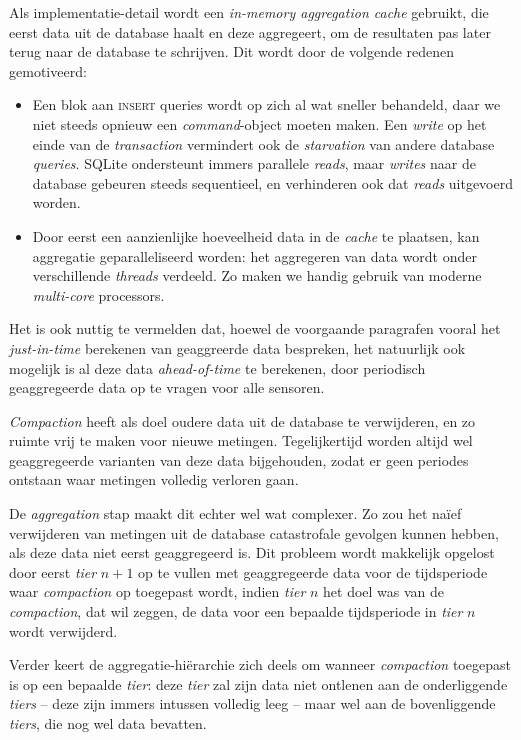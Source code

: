 \documentclass[12pt,draft,parskip=full]{article}
\begin{document}
Als implementatie-detail wordt een \emph{in-memory aggregation cache} gebruikt, die eerst data uit de database haalt en deze aggregeert, om de resultaten pas later terug naar de database te schrijven. Dit wordt door de volgende redenen gemotiveerd:

\begin{itemize}
	\item Een blok aan \textsc{insert} queries wordt op zich al wat sneller behandeld, daar we niet steeds opnieuw een \emph{command}-object moeten maken. Een \emph{write} op het einde van de \emph{transaction} vermindert ook de \emph{starvation} van andere database \emph{queries}. SQLite ondersteunt immers parallele \emph{reads}, maar \emph{writes} naar de database gebeuren steeds sequentieel, en verhinderen ook dat \emph{reads} uitgevoerd worden.

	\item Door eerst een aanzienlijke hoeveelheid data in de \emph{cache} te plaatsen, kan aggregatie geparalleliseerd worden: het aggregeren van data wordt onder verschillende \emph{threads} verdeeld. Zo maken we handig gebruik van moderne \emph{multi-core} processors.
\end{itemize}

Het is ook nuttig te vermelden dat, hoewel de voorgaande paragrafen vooral het \emph{just-in-time} berekenen van geaggreerde data bespreken, het natuurlijk ook mogelijk is al deze data \emph{ahead-of-time} te berekenen, door periodisch geaggregeerde data op te vragen voor alle sensoren.

\emph{Compaction} heeft als doel oudere data uit de database te verwijderen, en zo ruimte vrij te maken voor nieuwe metingen. Tegelijkertijd worden altijd wel geaggregeerde varianten van deze data bijgehouden, zodat er geen periodes ontstaan waar metingen volledig verloren gaan.

De \emph{aggregation} stap maakt dit echter wel wat complexer. Zo zou het na\"ief verwijderen van metingen uit de database catastrofale gevolgen kunnen hebben, als deze data niet eerst geaggregeerd is. Dit probleem wordt makkelijk opgelost door eerst \emph{tier} $n + 1$ op te vullen met geaggregeerde data voor de tijdsperiode waar \emph{compaction} op toegepast wordt, indien \emph{tier} $n$ het doel was van de \emph{compaction}, dat wil zeggen, de data voor een bepaalde tijdsperiode in \emph{tier} $n$ wordt verwijderd.

Verder keert de aggregatie-hi\"erarchie zich deels om wanneer \emph{compaction} toegepast is op een bepaalde \emph{tier}: deze \emph{tier} zal zijn data niet ontlenen aan de onderliggende \emph{tiers} -- deze zijn immers intussen volledig leeg -- maar wel aan de bovenliggende \emph{tiers}, die nog wel data bevatten.
\end{document}
